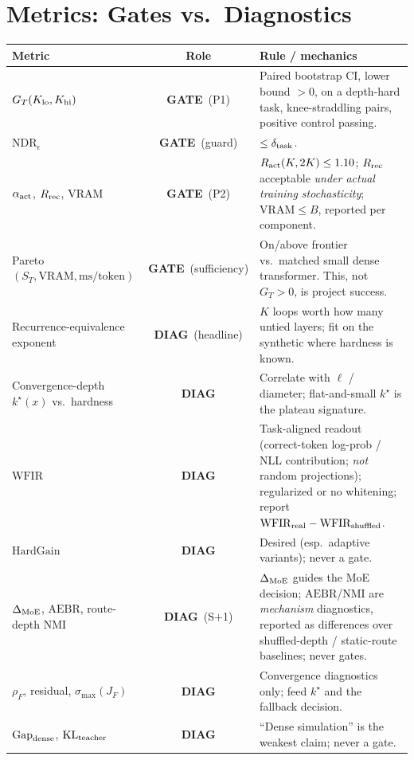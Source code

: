\documentclass[11pt]{article}
\newcommand{\vram}{\mathrm{VRAM}}
\newcommand{\GATE}{\textcolor{gate}{\textbf{GATE}}}\newcommand{\DIAG}{\textcolor{diag}{\textbf{DIAG}}}
\begin{document}
\section{Metrics: Gates vs.\ Diagnostics}
\renewcommand{\arraystretch}{1.2}
\begin{center}\footnotesize
\begin{tabularx}{\textwidth}{@{}L{0.27\textwidth} c L{0.50\textwidth}@{}}
\toprule
\textbf{Metric} & \textbf{Role} & \textbf{Rule / mechanics} \\
\midrule
$G_T(K_{\rm lo},K_{\rm hi})$ & \GATE\ (P1) & Paired bootstrap CI, lower bound $>0$, on a depth-hard task, knee-straddling pairs, positive control passing. \\
$\mathrm{NDR}_\epsilon$ & \GATE\ (guard) & $\le\delta_{\rm task}$. \\
$\alpha_{\rm act}$, $R_{\rm rec}$, $\vram$ & \GATE\ (P2) & $R_{\rm act}(K,2K)\le1.10$; $R_{\rm rec}$ acceptable \emph{under actual training stochasticity}; $\vram\le B$, reported per component. \\
Pareto $(S_T,\vram,\text{ms/token})$ & \GATE\ (sufficiency) & On/above frontier vs.\ matched small dense transformer. This, not $G_T>0$, is project success. \\
\midrule
Recurrence-equivalence exponent & \DIAG\ (headline) & $K$ loops worth how many untied layers; fit on the synthetic where hardness is known. \\
Convergence-depth $k^\star(x)$ vs.\ hardness & \DIAG & Correlate with $\ell$ / diameter; flat-and-small $k^\star$ is the plateau signature. \\
$\mathrm{WFIR}$ & \DIAG & Task-aligned readout (correct-token log-prob / NLL contribution; \emph{not} random projections); regularized or no whitening; report $\mathrm{WFIR}_{\rm real}-\mathrm{WFIR}_{\rm shuffled}$. \\
$\mathrm{HardGain}$ & \DIAG & Desired (esp.\ adaptive variants); never a gate. \\
$\Delta_{\rm MoE}$, $\mathrm{AEBR}$, route-depth NMI & \DIAG\ (S$+$1) & $\Delta_{\rm MoE}$ guides the MoE decision; $\mathrm{AEBR}$/NMI are \emph{mechanism} diagnostics, reported as differences over shuffled-depth / static-route baselines; never gates. \\
$\rho_F$, residual, $\sigma_{\max}(J_F)$ & \DIAG & Convergence diagnostics only; feed $k^\star$ and the fallback decision. \\
$\mathrm{Gap}_{\rm dense}$, $\mathrm{KL}_{\rm teacher}$ & \DIAG & ``Dense simulation'' is the weakest claim; never a gate. \\
\bottomrule
\end{tabularx}
\end{center}
\end{document}
